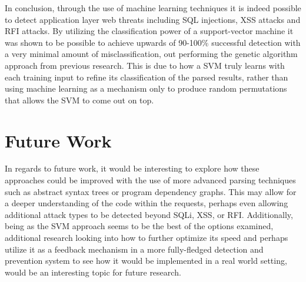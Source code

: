 In conclusion, through the use of machine learning techniques it is indeed possible to detect application layer web threats including SQL injections, XSS attacks and RFI attacks.  By utilizing the classification power of a support-vector machine it was shown to be possible to achieve upwards of 90-100\% successful detection with a very minimal amount of misclassification, out performing the genetic algorithm approach from previous research.  This is due to how a SVM truly learns with each training input to refine its classification of the parsed results, rather than using machine learning as a mechanism only to produce random permutations that allows the SVM to come out on top.

\section{Future Work}

In regards to future work, it would be interesting to explore how these approaches could be improved with the use of more advanced parsing techniques such as abstract syntax trees or program dependency graphs.  This may allow for a deeper understanding of the code within the requests, perhaps even allowing additional attack types to be detected beyond SQLi, XSS, or RFI.  Additionally, being as the SVM approach seems to be the best of the options examined, additional research looking into how to further optimize its speed and perhaps utilize it as a feedback mechanism in a more fully-fledged detection and prevention system to see how it would be implemented in a real world setting, would be an interesting topic for future research.
